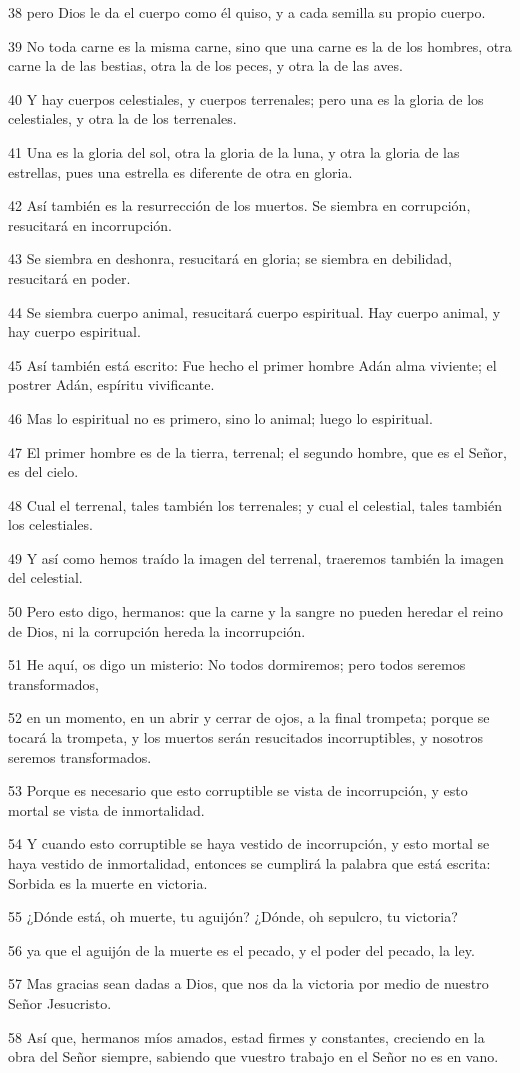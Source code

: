 \par 38 pero Dios le da el cuerpo como él quiso, y a cada semilla su propio cuerpo.
\par 39 No toda carne es la misma carne, sino que una carne es la de los hombres, otra carne la de las bestias, otra la de los peces, y otra la de las aves.
\par 40 Y hay cuerpos celestiales, y cuerpos terrenales; pero una es la gloria de los celestiales, y otra la de los terrenales.
\par 41 Una es la gloria del sol, otra la gloria de la luna, y otra la gloria de las estrellas, pues una estrella es diferente de otra en gloria.
\par 42 Así también es la resurrección de los muertos. Se siembra en corrupción, resucitará en incorrupción.
\par 43 Se siembra en deshonra, resucitará en gloria; se siembra en debilidad, resucitará en poder.
\par 44 Se siembra cuerpo animal, resucitará cuerpo espiritual. Hay cuerpo animal, y hay cuerpo espiritual.
\par 45 Así también está escrito: Fue hecho el primer hombre Adán alma viviente; el postrer Adán, espíritu vivificante.
\par 46 Mas lo espiritual no es primero, sino lo animal; luego lo espiritual.
\par 47 El primer hombre es de la tierra, terrenal; el segundo hombre, que es el Señor, es del cielo.
\par 48 Cual el terrenal, tales también los terrenales; y cual el celestial, tales también los celestiales.
\par 49 Y así como hemos traído la imagen del terrenal, traeremos también la imagen del celestial.
\par 50 Pero esto digo, hermanos: que la carne y la sangre no pueden heredar el reino de Dios, ni la corrupción hereda la incorrupción.
\par 51 He aquí, os digo un misterio: No todos dormiremos; pero todos seremos transformados,
\par 52 en un momento, en un abrir y cerrar de ojos, a la final trompeta; porque se tocará la trompeta, y los muertos serán resucitados incorruptibles, y nosotros seremos transformados.
\par 53 Porque es necesario que esto corruptible se vista de incorrupción, y esto mortal se vista de inmortalidad.
\par 54 Y cuando esto corruptible se haya vestido de incorrupción, y esto mortal se haya vestido de inmortalidad, entonces se cumplirá la palabra que está escrita: Sorbida es la muerte en victoria.
\par 55 ¿Dónde está, oh muerte, tu aguijón? ¿Dónde, oh sepulcro, tu victoria?
\par 56 ya que el aguijón de la muerte es el pecado, y el poder del pecado, la ley.
\par 57 Mas gracias sean dadas a Dios, que nos da la victoria por medio de nuestro Señor Jesucristo.
\par 58 Así que, hermanos míos amados, estad firmes y constantes, creciendo en la obra del Señor siempre, sabiendo que vuestro trabajo en el Señor no es en vano.

